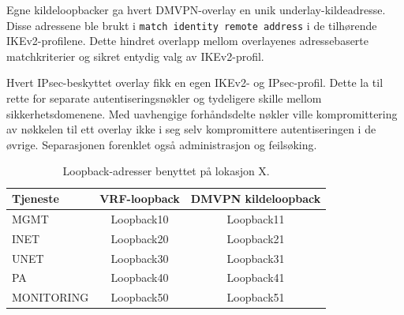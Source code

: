 Egne kildeloopbacker ga hvert DMVPN-overlay en unik
underlay-kildeadresse. Disse adressene ble brukt i
\texttt{match identity remote address} i de tilhørende
IKEv2-profilene. Dette hindret overlapp mellom overlayenes
adressebaserte matchkriterier og sikret entydig valg av
IKEv2-profil.

Hvert IPsec-beskyttet overlay fikk en egen IKEv2- og
IPsec-profil. Dette la til rette for separate
autentiseringsnøkler og tydeligere skille mellom
sikkerhetsdomenene. Med uavhengige forhåndsdelte nøkler
ville kompromittering av nøkkelen til ett overlay ikke
i seg selv kompromittere autentiseringen i de øvrige.
Separasjonen forenklet også administrasjon og feilsøking.

\begin{table}[H]
    \centering
    \caption{Loopback-adresser benyttet på lokasjon X.}
    \label{tab:loopback-site-x}
    \small
    \renewcommand{\arraystretch}{1.3}
    \setlength{\tabcolsep}{8pt}
    \begin{tabular}{lcc}
        \toprule
        \rowcolor{tablegreen}
        \color{white}\textbf{Tjeneste} &
        \color{white}\textbf{VRF-loopback} &
        \color{white}\textbf{DMVPN kildeloopback} \\
        \midrule
        MGMT       & Loopback10 & Loopback11 \\
        INET       & Loopback20 & Loopback21 \\
        UNET       & Loopback30 & Loopback31 \\
        PA         & Loopback40 & Loopback41 \\
        MONITORING & Loopback50 & Loopback51 \\
        \bottomrule
    \end{tabular}
\end{table}

